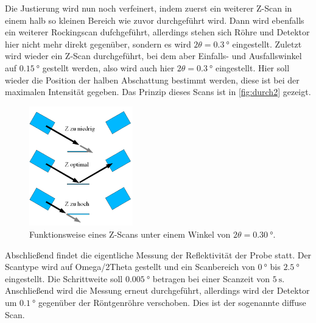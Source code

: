 Die Justierung wird nun noch verfeinert, indem zuerst ein weiterer Z-Scan in einem halb so kleinen Bereich wie zuvor durchgeführt wird.
Dann wird ebenfalls ein weiterer Rockingscan dufchgeführt, allerdings stehen sich Röhre und Detektor hier nicht mehr direkt gegenüber, 
sondern es wird $2\theta = \SI{0.3}{\degree}$ eingestellt.
Zuletzt wird wieder ein Z-Scan durchgeführt, bei dem aber Einfalls- und Ausfallswinkel auf $\SI{0.15}{\degree}$ gestellt werden, also wird auch hier $2\theta = \SI{0.3}{\degree}$ eingestellt.
Hier soll wieder die Position der halben Abschattung bestimmt werden, diese ist bei der maximalen Intensität gegeben. 
Das Prinzip dieses Scans ist in \autoref{fig:durch2} gezeigt.

\begin{figure}
    \centering
    \includegraphics[width=0.4\textwidth]{images/z.png}
    \caption{Funktionsweise eines Z-Scans unter einem Winkel von $2 \theta = \SI{0.30}{\degree}$. \cite{V44}}
    \label{fig:durch2}
\end{figure}

Abschließend findet die eigentliche Messung der Reflektivität der Probe statt.
Der Scantype wird auf Omega/2Theta gestellt und ein Scanbereich von $\SI{0}{\degree}$ bis $\SI{2.5}{\degree}$ eingestellt.
Die Schrittweite soll $\SI{0.005}{\degree}$ betragen bei einer Scanzeit von $\SI{5}{\second}$.
Anschließend wird die Messung erneut durchgeführt, allerdings wird der Detektor um $\SI{0.1}{\degree}$ gegenüber der Röntgenröhre verschoben.
Dies ist der sogenannte diffuse Scan.
